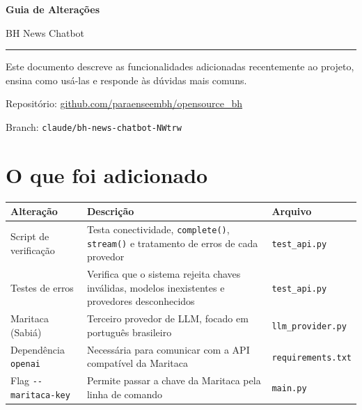 \documentclass[12pt,a4paper]{article}
\begin{document}
\begin{titlepage}
  \centering
  \vspace*{3cm}
  {\Huge\bfseries\color{sectioncolor} Guia de Alterações\par}
  \vspace{0.5cm}
  {\Large BH News Chatbot\par}
  \vspace{1.5cm}
  \rule{0.5\linewidth}{0.4pt}\par
  \vspace{1cm}
  {\large Este documento descreve as funcionalidades adicionadas recentemente ao projeto,
  ensina como usá-las e responde às dúvidas mais comuns.\par}
  \vfill
  {\small Repositório: \href{https://github.com/paraenseembh/opensource_bh}%
    {github.com/paraenseembh/opensource\_bh}\par}
  \vspace{0.3cm}
  {\small Branch: \texttt{claude/bh-news-chatbot-NWtrw}\par}
  \vspace{1cm}
\end{titlepage}

\tableofcontents
\newpage

\section{O que foi adicionado}

\begin{tabularx}{\linewidth}{lLl}
  \toprule
  \textbf{Alteração} & \textbf{Descrição} & \textbf{Arquivo} \\
  \midrule
  Script de verificação & Testa conectividade, \texttt{complete()}, \texttt{stream()} e
    tratamento de erros de cada provedor & \texttt{test\_api.py} \\
  \addlinespace
  Testes de erros & Verifica que o sistema rejeita chaves inválidas, modelos inexistentes
    e provedores desconhecidos & \texttt{test\_api.py} \\
  \addlinespace
  Maritaca (Sabiá) & Terceiro provedor de LLM, focado em português brasileiro
    & \texttt{llm\_provider.py} \\
  \addlinespace
  Dependência \texttt{openai} & Necessária para comunicar com a API compatível da Maritaca
    & \texttt{requirements.txt} \\
  \addlinespace
  Flag \texttt{-{}-maritaca-key} & Permite passar a chave da Maritaca pela linha de comando
    & \texttt{main.py} \\
  \bottomrule
\end{tabularx}
\end{document}
